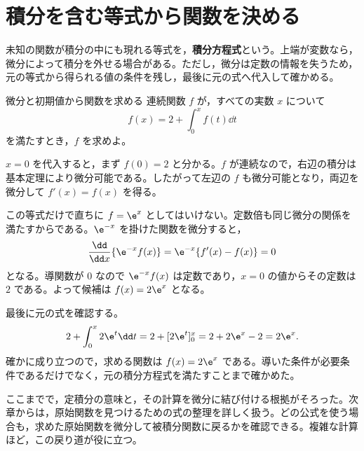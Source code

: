 \section{積分を含む等式から関数を決める}\label{節:積分方程式}
未知の関数が積分の中にも現れる等式を，\textbf{積分方程式}という。上端が変数なら，微分によって積分を外せる場合がある。ただし，微分は定数の情報を失うため，元の等式から得られる値の条件を残し，最後に元の式へ代入して確かめる。

\begin{example}{微分と初期値から関数を求める}
連続関数 $f$ が，すべての実数 $x$ について
\[
 f(x)=2+\int_0^x f(t)\dd t
\]
を満たすとき，$f$ を求めよ。
\end{example}
$x=0$ を代入すると，まず $f(0)=2$ と分かる。$f$ が連続なので，右辺の積分は基本定理により微分可能である。したがって左辺の $f$ も微分可能となり，両辺を微分して $f'(x)=f(x)$ を得る。

この等式だけで直ちに $f=\e^x$ としてはいけない。定数倍も同じ微分の関係を満たすからである。$\e^{-x}$ を掛けた関数を微分すると，
\[
 \frac{\dd}{\dd x}\{\e^{-x}f(x)\}
 =\e^{-x}\{f'(x)-f(x)\}=0
\]
となる。導関数が $0$ なので $\e^{-x}f(x)$ は定数であり，$x=0$ の値からその定数は $2$ である。よって候補は $f(x)=2\e^x$ となる。

最後に元の式を確認する。
\[
 2+\int_0^x2\e^t\dd t
 =2+[2\e^t]_0^x=2+2\e^x-2=2\e^x.
\]
確かに成り立つので，求める関数は $f(x)=2\e^x$ である。導いた条件が必要条件であるだけでなく，元の積分方程式を満たすことまで確かめた。

ここまでで，定積分の意味と，その計算を微分に結び付ける根拠がそろった。次章からは，原始関数を見つけるための式の整理を詳しく扱う。どの公式を使う場合も，求めた原始関数を微分して被積分関数に戻るかを確認できる。複雑な計算ほど，この戻り道が役に立つ。

